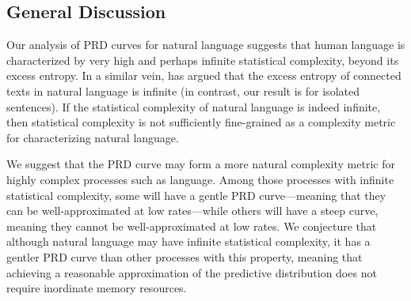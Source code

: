 \documentclass[entropy,article,submit,moreauthors,pdftex,10pt,a4paper]{Definitions/mdpi}
\begin{document}
\subsection{General Discussion}

Our analysis of PRD curves for natural language suggests that human language is characterized by very high and perhaps infinite statistical complexity, beyond its excess entropy. In a similar vein, \citet{dkebowski2018natural} has argued that the excess entropy of connected texts in natural language is infinite (in contrast, our result is for isolated sentences). If the statistical complexity of natural language is indeed infinite, then statistical complexity is not sufficiently fine-grained as a complexity metric for characterizing natural language. 

We suggest that the PRD curve may form a more natural complexity metric for highly complex processes such as language. Among those processes with infinite statistical complexity, some will have a gentle PRD curve---meaning that they can be well-approximated at low rates---while others will have a steep curve, meaning they cannot be well-approximated at low rates. We conjecture that although natural language may have infinite statistical complexity, it has a gentler PRD curve than other processes with this property, meaning that achieving a reasonable approximation of the predictive distribution does not require inordinate memory resources.

%
%
\end{document}
